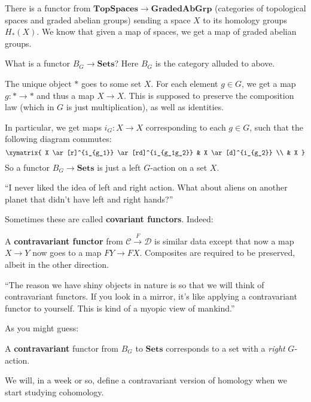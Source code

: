 \begin{example} There is a functor from $\mathbf{TopSpaces} \to
\mathbf{GradedAbGrp}$ (categories of topological spaces and graded abelian
groups) sending a space $X$ to its homology groups $H_*(X)$. We know that
given a map of spaces, we get a map of graded abelian groups. \end{example}

\begin{example} What is a functor $B_G \stackrel{}{\to} \mathbf{Sets}$? Here
$B_G$ is the category alluded to above.

The unique object $\ast$ goes to some set $X$. For each element $g \in G$, we
get a map $g: \ast \to \ast$ and thus a map $X \to X$. This is supposed to
preserve the composition law (which in $G$ is just multiplication), as well as
identities.

In particular, we get maps $i_G: X \to X$ corresponding to each $g \in G$,
such that the following diagram commutes: \[ \xymatrix{ X \ar[r]^{i_{g_1}}
\ar[rd]^{i_{g_1g_2}} & X \ar[d]^{i_{g_2}} \\ & X }\] So a functor $B_G \to
\mathbf{Sets}$ is just a left $G$-action on a set $X$. \end{example}

``I never liked the idea of left and right action. What about aliens on
another planet that didn't have left and right hands?''

Sometimes these are called \textbf{covariant functors}. Indeed:

\begin{definition} A \textbf{contravariant functor} from $\mathcal{C}
\stackrel{F}{\to}\mathcal{D}$ is similar data except that now a map $X \to Y$
now goes to a map $FY \to FX$. Composites are required to be preserved, albeit
in the other direction. \end{definition}

``The reason we have shiny objects in nature is so that we will think of
contravariant functors. If you look in a mirror, it's like applying a
contravariant functor to yourself. This is kind of a myopic view of mankind.''

As you might guess:

\begin{example} A \textbf{contravariant} functor from $B_G$ to $\mathbf{Sets}$
corresponds to a set with a \emph{right} $G$-action. \end{example}

We will, in a week or so, define a contravariant version of homology when we
start studying cohomology.

